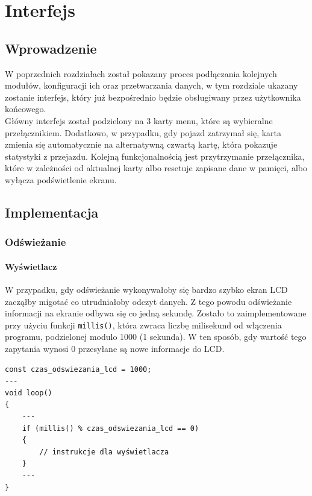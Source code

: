 \chapter{Interfejs}
\section{Wprowadzenie}
W poprzednich rozdziałach został pokazany proces podłączania kolejnych modułów, konfiguracji ich oraz przetwarzania danych, w tym rozdziale ukazany zostanie interfejs, który już bezpośrednio będzie obsługiwany przez użytkownika końcowego.\\

Główny interfejs został podzielony na 3 karty menu, które są wybieralne przełącznikiem. Dodatkowo, w przypadku, gdy pojazd zatrzymał się, karta zmienia się automatycznie na alternatywną czwartą kartę, która pokazuje statystyki z przejazdu. Kolejną funkcjonalnością jest przytrzymanie przełącznika, które w zależności od aktualnej karty albo resetuje zapisane dane w pamięci, albo wyłącza podświetlenie ekranu.
\section{Implementacja}

\subsection{Odświeżanie}
\subsubsection{Wyświetlacz}
W przypadku, gdy odświeżanie wykonywałoby się bardzo szybko ekran LCD zacząłby migotać co utrudniałoby odczyt danych. Z tego powodu odświeżanie informacji na ekranie odbywa się co jedną sekundę. Zostało to zaimplementowane przy użyciu funkcji \texttt{millis()}, która zwraca liczbę milisekund od włączenia programu, podzielonej modulo 1000 (1 sekunda). W ten sposób, gdy wartość tego zapytania wynosi 0 przesyłane są nowe informacje do LCD.

\begin{lstlisting}[label=list:refresh_rate,caption=Implementacja odświeżania ekranu,
basicstyle=\footnotesize\ttfamily]
const czas_odswiezania_lcd = 1000;
---
void loop()
{
    ---
    if (millis() % czas_odswiezania_lcd == 0) 
    {
        // instrukcje dla wyświetlacza
    }
    ---
}

\end{lstlisting}


